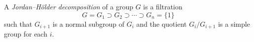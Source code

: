 \documentclass{article}
\begin{document}
A {\em Jordan--H\"older decomposition} of a group $G$ is a filtration
$$
G = G_1 \supset G_2 \supset \cdots \supset G_n = \{1\}
$$
such that $G_{i+1}$ is a normal subgroup of $G_i$ and the quotient $G_i/G_{i+1}$ is a simple group for each $i$.
\end{document}
